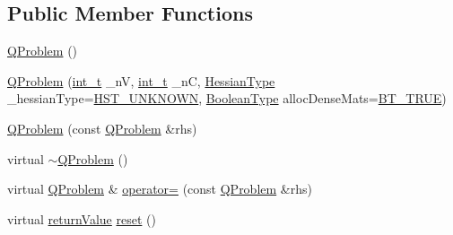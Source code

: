 \subsection*{Public Member Functions}
\begin{DoxyCompactItemize}
\item 
\hyperlink{class_q_problem_a616f7620819c532d2d58b4c792478d63}{Q\+Problem} ()
\item 
\hyperlink{class_q_problem_a0d1017498dbefdcb10dab87abbf19ef9}{Q\+Problem} (\hyperlink{_types_8hpp_ab6fd6105e64ed14a0c9281326f05e623}{int\+\_\+t} \+\_\+nV, \hyperlink{_types_8hpp_ab6fd6105e64ed14a0c9281326f05e623}{int\+\_\+t} \+\_\+nC, \hyperlink{_types_8hpp_a604cad5cda14e378ce4a77ab28ee9fd9}{Hessian\+Type} \+\_\+hessian\+Type=\hyperlink{_types_8hpp_a604cad5cda14e378ce4a77ab28ee9fd9a3479cf4e632ae731d4da9bf57a9f8907}{H\+S\+T\+\_\+\+U\+N\+K\+N\+O\+WN}, \hyperlink{_types_8hpp_a20f82124c82b6f5686a7fce454ef9089}{Boolean\+Type} alloc\+Dense\+Mats=\hyperlink{_types_8hpp_a20f82124c82b6f5686a7fce454ef9089a34c57965bfb07125b09326a69019f9c6}{B\+T\+\_\+\+T\+R\+UE})
\item 
\hyperlink{class_q_problem_a35ed81509c1ec9cbbb33992257762da3}{Q\+Problem} (const \hyperlink{class_q_problem}{Q\+Problem} \&rhs)
\item 
virtual \hyperlink{class_q_problem_aa3b77fe7ac77479aacee421fdeba5bca}{$\sim$\+Q\+Problem} ()
\item 
virtual \hyperlink{class_q_problem}{Q\+Problem} \& \hyperlink{class_q_problem_a70c1323e3b23d837b4723a6386f2b1d2}{operator=} (const \hyperlink{class_q_problem}{Q\+Problem} \&rhs)
\item 
virtual \hyperlink{_message_handling_8hpp_a81d556f613bfbabd0b1f9488c0fa865e}{return\+Value} \hyperlink{class_q_problem_a2f752d39b6935d929b963363a314b6bd}{reset} ()
\item 

\end{DoxyCompactItemize}
